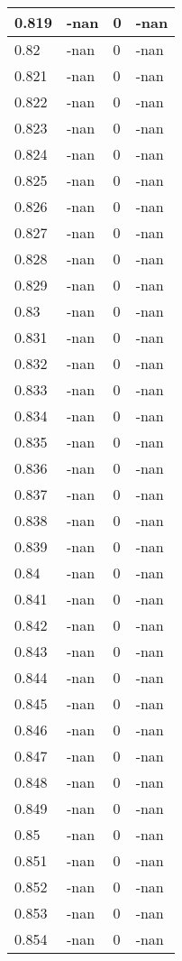 \documentclass[a4paper,14pt]{extarticle}
\begin{document}
\begin{longtable}{||m{3cm}||m{3cm}|m{3cm}||m{3cm}||}
\hline
0.819 & -nan & 0 & -nan\\
\hline
0.82 & -nan & 0 & -nan\\
\hline
0.821 & -nan & 0 & -nan\\
\hline
0.822 & -nan & 0 & -nan\\
\hline
0.823 & -nan & 0 & -nan\\
\hline
0.824 & -nan & 0 & -nan\\
\hline
0.825 & -nan & 0 & -nan\\
\hline
0.826 & -nan & 0 & -nan\\
\hline
0.827 & -nan & 0 & -nan\\
\hline
0.828 & -nan & 0 & -nan\\
\hline
0.829 & -nan & 0 & -nan\\
\hline
0.83 & -nan & 0 & -nan\\
\hline
0.831 & -nan & 0 & -nan\\
\hline
0.832 & -nan & 0 & -nan\\
\hline
0.833 & -nan & 0 & -nan\\
\hline
0.834 & -nan & 0 & -nan\\
\hline
0.835 & -nan & 0 & -nan\\
\hline
0.836 & -nan & 0 & -nan\\
\hline
0.837 & -nan & 0 & -nan\\
\hline
0.838 & -nan & 0 & -nan\\
\hline
0.839 & -nan & 0 & -nan\\
\hline
0.84 & -nan & 0 & -nan\\
\hline
0.841 & -nan & 0 & -nan\\
\hline
0.842 & -nan & 0 & -nan\\
\hline
0.843 & -nan & 0 & -nan\\
\hline
0.844 & -nan & 0 & -nan\\
\hline
0.845 & -nan & 0 & -nan\\
\hline
0.846 & -nan & 0 & -nan\\
\hline
0.847 & -nan & 0 & -nan\\
\hline
0.848 & -nan & 0 & -nan\\
\hline
0.849 & -nan & 0 & -nan\\
\hline
0.85 & -nan & 0 & -nan\\
\hline
0.851 & -nan & 0 & -nan\\
\hline
0.852 & -nan & 0 & -nan\\
\hline
0.853 & -nan & 0 & -nan\\
\hline
0.854 & -nan & 0 & -nan\\

\end{longtable}
\end{document}
